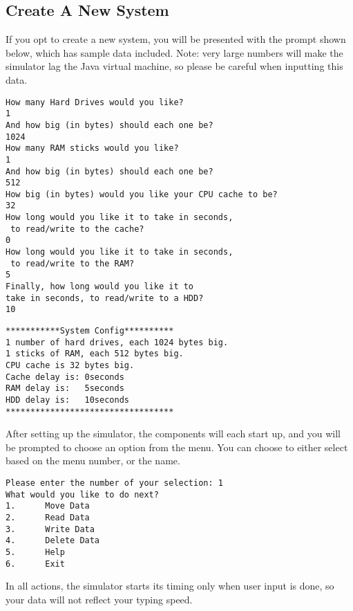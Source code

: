 \documentclass[12pt]{article}
\newcommand{\singlespace}{
  \protect\renewcommand\baselinestretch{1.0}
  \protect\normalsize
}
\begin{document}
\subsection*{Create A New System}
If you opt to create a new system, you will be presented with the prompt shown below,
which has sample data included. Note: very large numbers will make the simulator lag
the Java virtual machine, so please be careful when inputting this data.
{\singlespace
\begin{verbatim}
How many Hard Drives would you like?
1
And how big (in bytes) should each one be?
1024
How many RAM sticks would you like?
1
And how big (in bytes) should each one be?
512
How big (in bytes) would you like your CPU cache to be?
32
How long would you like it to take in seconds,
 to read/write to the cache?
0
How long would you like it to take in seconds,
 to read/write to the RAM?
5
Finally, how long would you like it to 
take in seconds, to read/write to a HDD?
10
\end{verbatim}
\begin{verbatim}
***********System Config**********
1 number of hard drives, each 1024 bytes big.
1 sticks of RAM, each 512 bytes big.
CPU cache is 32 bytes big.
Cache delay is: 0seconds
RAM delay is:   5seconds
HDD delay is:   10seconds
**********************************
\end{verbatim}
}
After setting up the simulator, the components will each start up, and
you will be prompted to choose an option from the menu. You can choose to either
select based on the menu number, or the name.
{\singlespace
\begin{verbatim}
Please enter the number of your selection: 1
What would you like to do next?
1.      Move Data
2.      Read Data
3.      Write Data
4.      Delete Data
5.      Help
6.      Exit
\end{verbatim}
}

In all actions, the simulator starts its timing only when user input is done,
so your data will not reflect your typing speed.
\end{document}
